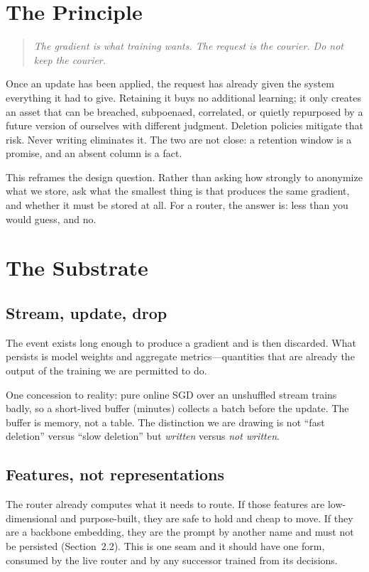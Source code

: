 \documentclass[11pt,a4paper]{article}
\begin{document}
\section{The Principle}

\begin{quote}
\emph{The gradient is what training wants. The request is the courier. Do not keep the
courier.}
\end{quote}

Once an update has been applied, the request has already given the system everything it had
to give. Retaining it buys no additional learning; it only creates an asset that can be
breached, subpoenaed, correlated, or quietly repurposed by a future version of ourselves
with different judgment. Deletion policies mitigate that risk. Never writing eliminates it.
The two are not close: a retention window is a promise, and an absent column is a fact.

This reframes the design question. Rather than asking how strongly to anonymize what we
store, ask what the smallest thing is that produces the same gradient, and whether it must
be stored at all. For a router, the answer is: less than you would guess, and no.

\section{The Substrate}

\subsection{Stream, update, drop}

The event exists long enough to produce a gradient and is then discarded. What persists is
model weights and aggregate metrics---quantities that are already the output of the
training we are permitted to do.

One concession to reality: pure online SGD over an unshuffled stream trains badly, so a
short-lived buffer (minutes) collects a batch before the update. The buffer is memory, not
a table. The distinction we are drawing is not ``fast deletion'' versus ``slow deletion''
but \emph{written} versus \emph{not written}.

\subsection{Features, not representations}

The router already computes what it needs to route. If those features are low-dimensional
and purpose-built, they are safe to hold and cheap to move. If they are a backbone
embedding, they are the prompt by another name and must not be persisted (Section~2.2).
This is one seam and it should have one form, consumed by the live router and by any
successor trained from its decisions.
\end{document}
